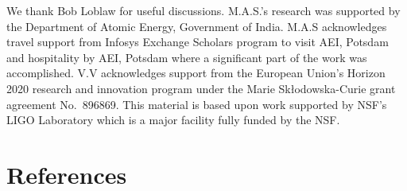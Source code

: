 \documentclass[aps,prd,amsmath,floats,floatfix, twocolumn,
superscriptaddress,nofootinbib,showpacs]{revtex4-1}
\begin{document}
\begin{acknowledgments}
We thank Bob Loblaw for useful discussions.
M.A.S.’s research was supported by the Department of Atomic Energy,
Government of India. M.A.S acknowledges travel support from Infosys
Exchange Scholars program to visit AEI, Potsdam and hospitality by
AEI, Potsdam where a significant part of the work was accomplished.
V.V acknowledges support from the European Union’s Horizon 2020
research and innovation program under the Marie Skłodowska-Curie grant
agreement No.~896869.
This material is based upon work supported by NSF's LIGO Laboratory
which is a major facility fully funded by the NSF.
\end{acknowledgments}

\section*{References}

\end{document}
